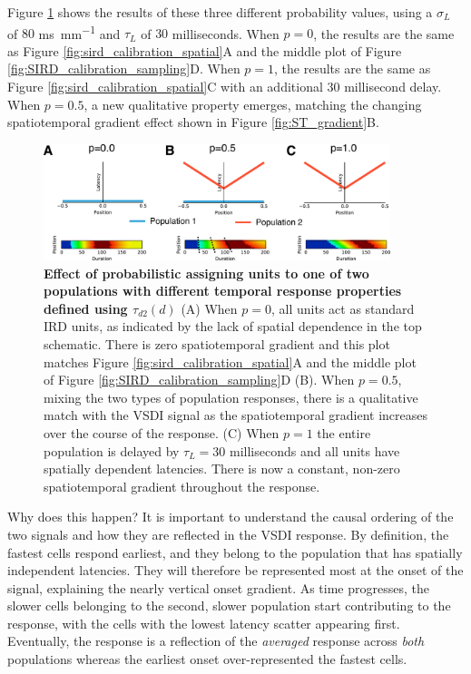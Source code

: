 \documentclass[phd,ianc,twoside]{infthesis}
\begin{document}
Figure \ref{fig:sird_calibration_two_population} shows the results of
these three different probability values, using a $\sigma_L$ of $80$
\si{ms.mm^{-1}} and $\tau_L$ of $30$ milliseconds. When $p=0$, the
results are the same as Figure \ref{fig:sird_calibration_spatial}A and
the middle plot of Figure \ref{fig:SIRD_calibration_sampling}D. When
$p=1$, the results are the same as Figure
\ref{fig:sird_calibration_spatial}C with an additional $30$ millisecond
delay. When $p=0.5$, a new qualitative property emerges, matching the
changing spatiotemporal gradient effect shown in Figure
\ref{fig:ST_gradient}B.

\begin{figure}
  \center
  \includegraphics[width=0.9\textwidth]{./figures/sird_calibration_two_population.pdf}
\caption{{\bf Effect of probabilistic assigning units to one of two
    populations with different temporal response properties defined
    using $\tau_{d2}(d)$ } (A) When $p=0$, all units act as standard IRD
  units, as indicated by the lack of spatial dependence in the top
  schematic. There is zero spatiotemporal gradient and this plot matches
  Figure \ref{fig:sird_calibration_spatial}A and the middle plot of
  Figure \ref{fig:SIRD_calibration_sampling}D (B). When $p=0.5$, mixing
  the two types of population responses, there is a qualitative match
  with the VSDI signal as the spatiotemporal gradient increases over the
  course of the response. (C) When $p=1$ the entire population is
  delayed by $\tau_L=30$ milliseconds and all units have spatially
  dependent latencies. There is now a constant, non-zero spatiotemporal
  gradient throughout the response.}
\label{fig:sird_calibration_two_population}
\end{figure}


Why does this happen? It is important to understand the causal ordering
of the two signals and how they are reflected in the VSDI response. By
definition, the fastest cells respond earliest, and they belong to the
population that has spatially independent latencies. They will
therefore be represented most at the onset of the signal, explaining the
nearly vertical onset gradient. As time progresses, the slower cells
belonging to the second, slower population start contributing to the
response, with the cells with the lowest latency scatter appearing
first. Eventually, the response is a reflection of the \emph{averaged}
response across \emph{both} populations whereas the earliest onset
over-represented the fastest cells.
\end{document}
